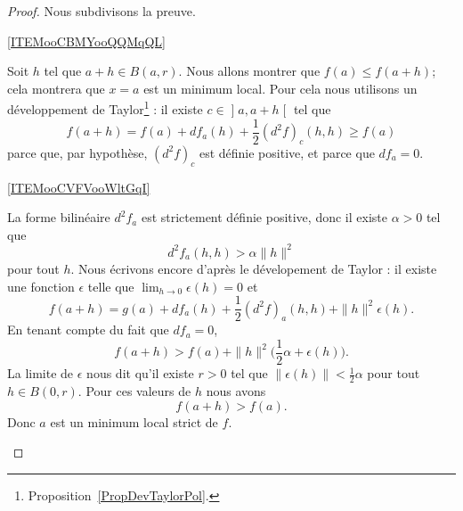 \begin{proof}
    Nous subdivisons la preuve.

    \begin{subproof}

    \item[\ref{ITEMooCBMYooQQMqQL}]

        Soit \( h\) tel que \( a+h\in B(a,r)\). Nous allons montrer que \( f(a)\leq f(a+h)\); cela montrera que \( x=a\) est un minimum local. Pour cela nous utilisons un développement de Taylor\footnote{Proposition~\ref{PropDevTaylorPol}.} : il existe \( c\in \mathopen] a , a+h \mathclose[\) tel que
        \begin{equation}
            f(a+h)=f(a)+df_a(h)+\frac{ 1 }{2}(d^2f)_c(h,h)\geq f(a)
        \end{equation}
        parce que, par hypothèse, \( (d^2f)_c\) est définie positive, et parce que \( df_a=0\).

    \item[\ref{ITEMooCVFVooWltGqI}]

        La forme bilinéaire \( d^2f_a\) est strictement définie positive, donc il existe \( \alpha>0\) tel que
        \begin{equation}
            d^2f_a(h,h)>\alpha\| h \|^2
        \end{equation}
        pour tout \( h\). Nous écrivons encore d'après le dévelopement de Taylor : il existe une fonction \( \epsilon\) telle que \( \lim_{h\to 0} \epsilon(h)=0\) et
        \begin{equation}
            f(a+h)=g(a)+df_a(h)+\frac{ 1 }{2}(d^2f)_a(h,h)+\| h \|^2\epsilon(h).
        \end{equation}
        En tenant compte du fait que \( df_a=0\),
        \begin{equation}
            f(a+h)>f(a)+\| h \|^2\big( \frac{ 1 }{2}\alpha+ \epsilon(h) \big).
        \end{equation}
        La limite de \( \epsilon\) nous dit qu'il existe \( r>0\) tel que \( \| \epsilon(h) \|<\frac{ 1 }{2}\alpha\) pour tout \( h\in B(0,r)\). Pour ces valeurs de \( h\) nous avons
        \begin{equation}
            f(a+h)>f(a).
        \end{equation}
        Donc \( a\) est un minimum local strict de \( f\).


\end{subproof}
\end{proof}
